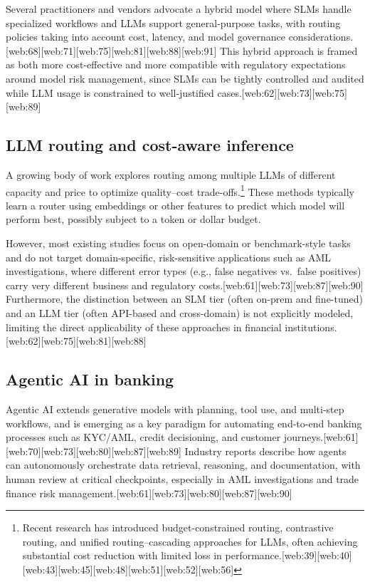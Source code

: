 \documentclass[11pt]{article}
\begin{document}
Several practitioners and vendors advocate a hybrid model where SLMs handle specialized workflows and LLMs support general-purpose tasks, with routing policies taking into account cost, latency, and model governance considerations.[web:68][web:71][web:75][web:81][web:88][web:91] This hybrid approach is framed as both more cost-effective and more compatible with regulatory expectations around model risk management, since SLMs can be tightly controlled and audited while LLM usage is constrained to well-justified cases.[web:62][web:73][web:75][web:89]

\subsection{LLM routing and cost-aware inference}

A growing body of work explores routing among multiple LLMs of different capacity and price to optimize quality--cost trade-offs.\footnote{Recent research has introduced budget-constrained routing, contrastive routing, and unified routing--cascading approaches for LLMs, often achieving substantial cost reduction with limited loss in performance.[web:39][web:40][web:43][web:45][web:48][web:51][web:52][web:56]} These methods typically learn a router using embeddings or other features to predict which model will perform best, possibly subject to a token or dollar budget. 

However, most existing studies focus on open-domain or benchmark-style tasks and do not target domain-specific, risk-sensitive applications such as AML investigations, where different error types (e.g., false negatives vs.\ false positives) carry very different business and regulatory costs.[web:61][web:73][web:87][web:90] Furthermore, the distinction between an SLM tier (often on-prem and fine-tuned) and an LLM tier (often API-based and cross-domain) is not explicitly modeled, limiting the direct applicability of these approaches in financial institutions.[web:62][web:75][web:81][web:88]

\subsection{Agentic AI in banking}

Agentic AI extends generative models with planning, tool use, and multi-step workflows, and is emerging as a key paradigm for automating end-to-end banking processes such as KYC/AML, credit decisioning, and customer journeys.[web:61][web:70][web:73][web:80][web:87][web:89] Industry reports describe how agents can autonomously orchestrate data retrieval, reasoning, and documentation, with human review at critical checkpoints, especially in AML investigations and trade finance risk management.[web:61][web:73][web:80][web:87][web:90] 
\end{document}
